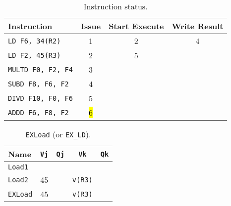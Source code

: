 \begin{enumerate}
    \begin{table}[!htp]
        \centering
        \begin{tabular}{@{} l | c c c @{}}
            \toprule
            Instruction                 & Issue & Start Execute & Write Result  \\
            \midrule
            \texttt{LD    F6, 34(R2)}   & 1     & 2             & 4             \\ [.3em]
            \texttt{LD    F2, 45(R3)}   & 2     & 5             &               \\ [.3em]
            \texttt{MULTD F0, F2, F4}   & 3     &               &               \\ [.3em]
            \texttt{SUBD  F8, F6, F2}   & 4     &               &               \\ [.3em]
            \texttt{DIVD  F10, F0, F6}  & 5     &               &               \\ [.3em]
            \texttt{ADDD  F6, F8, F2}   & \hl{6}&               &               \\
            \bottomrule
        \end{tabular}
        \caption*{Instruction status.}
    \end{table}

    \begin{table}[!htp]
        \centering
        \begin{tabular}{@{} l | c c c c @{}}
            \toprule
            Name            & \texttt{Vj}   & \texttt{Qj}   & \texttt{Vk}           & \texttt{Qk}   \\
            \midrule
            \texttt{Load1}  &               &               &                       &               \\ [.3em]
            \texttt{Load2}  & 45            &               & \texttt{v(R3)}        &               \\
            \cmidrule{1-5}
            \texttt{EXLoad} & 45            &               & \texttt{v(R3)}        &               \\
            \bottomrule
        \end{tabular}
        \caption*{\texttt{EXLoad} (or \texttt{EX\_LD}).}
    \end{table}

    \newpage


\end{enumerate}
